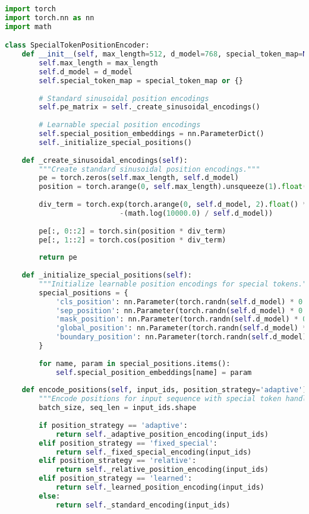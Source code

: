 \begin{lstlisting}[language=Python, caption=Flexible position encoding for special tokens]
import torch
import torch.nn as nn
import math

class SpecialTokenPositionEncoder:
    def __init__(self, max_length=512, d_model=768, special_token_map=None):
        self.max_length = max_length
        self.d_model = d_model
        self.special_token_map = special_token_map or {}
        
        # Standard sinusoidal position encodings
        self.pe_matrix = self._create_sinusoidal_encodings()
        
        # Learnable special position encodings
        self.special_position_embeddings = nn.ParameterDict()
        self._initialize_special_positions()
        
    def _create_sinusoidal_encodings(self):
        """Create standard sinusoidal position encodings."""
        pe = torch.zeros(self.max_length, self.d_model)
        position = torch.arange(0, self.max_length).unsqueeze(1).float()
        
        div_term = torch.exp(torch.arange(0, self.d_model, 2).float() *
                           -(math.log(10000.0) / self.d_model))
        
        pe[:, 0::2] = torch.sin(position * div_term)
        pe[:, 1::2] = torch.cos(position * div_term)
        
        return pe
        
    def _initialize_special_positions(self):
        """Initialize learnable position encodings for special tokens."""
        special_positions = {
            'cls_position': nn.Parameter(torch.randn(self.d_model) * 0.02),
            'sep_position': nn.Parameter(torch.randn(self.d_model) * 0.02),
            'mask_position': nn.Parameter(torch.randn(self.d_model) * 0.02),
            'global_position': nn.Parameter(torch.randn(self.d_model) * 0.02),
            'boundary_position': nn.Parameter(torch.randn(self.d_model) * 0.02)
        }
        
        for name, param in special_positions.items():
            self.special_position_embeddings[name] = param
            
    def encode_positions(self, input_ids, position_strategy='adaptive'):
        """Encode positions for input sequence with special token handling."""
        batch_size, seq_len = input_ids.shape
        
        if position_strategy == 'adaptive':
            return self._adaptive_position_encoding(input_ids)
        elif position_strategy == 'fixed_special':
            return self._fixed_special_encoding(input_ids)
        elif position_strategy == 'relative':
            return self._relative_position_encoding(input_ids)
        elif position_strategy == 'learned':
            return self._learned_position_encoding(input_ids)
        else:
            return self._standard_encoding(input_ids)
            

\end{lstlisting}
